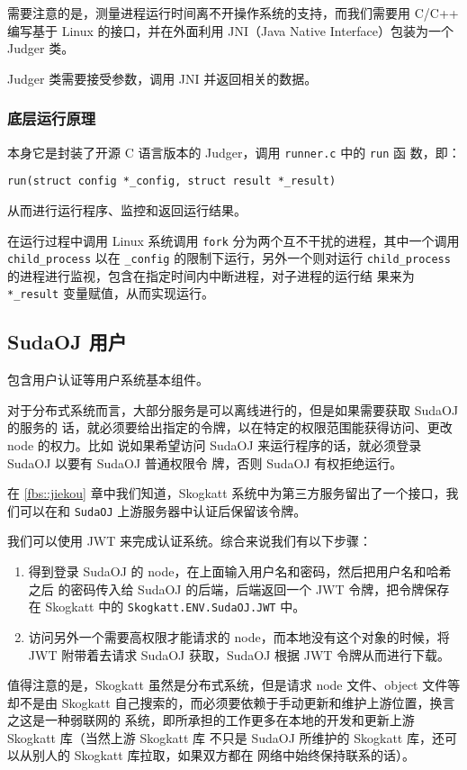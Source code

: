 需要注意的是，测量进程运行时间离不开操作系统的支持，而我们需要用 C/C++ 编写基于
Linux 的接口，并在外面利用 JNI（Java Native Interface）包装为一个 Judger 类。

Judger 类需要接受参数，调用 JNI 并返回相关的数据。

\subsubsection{底层运行原理}

本身它是封装了开源 C 语言版本的 Judger，调用 \verb|runner.c| 中的 \verb|run| 函
数，即：
\begin{lstlisting}
run(struct config *_config, struct result *_result)
\end{lstlisting}
从而进行运行程序、监控和返回运行结果。

在运行过程中调用 Linux 系统调用 \verb|fork| 分为两个互不干扰的进程，其中一个调用 %
\verb|child_process| 以在 \verb|_config| 的限制下运行，另外一个则对运行 %
\verb|child_process| 的进程进行监视，包含在指定时间内中断进程，对子进程的运行结
果来为 \verb|*_result| 变量赋值，从而实现运行。

\subsection{SudaOJ 用户}
包含用户认证等用户系统基本组件。

对于分布式系统而言，大部分服务是可以离线进行的，但是如果需要获取 SudaOJ 的服务的
话，就必须要给出指定的令牌，以在特定的权限范围能获得访问、更改 node 的权力。比如
说如果希望访问 SudaOJ 来运行程序的话，就必须登录 SudaOJ 以要有 SudaOJ 普通权限令
牌，否则 SudaOJ 有权拒绝运行。

在 \ref{fbs::jiekou} 章中我们知道，Skogkatt 系统中为第三方服务留出了一个接口，我
们可以在和 \verb|SudaOJ| 上游服务器中认证后保留该令牌。

我们可以使用 JWT 来完成认证系统。综合来说我们有以下步骤：
\begin{enumerate}
    \item 得到登录 SudaOJ 的 node，在上面输入用户名和密码，然后把用户名和哈希之后
        的密码传入给 SudaOJ 的后端，后端返回一个 JWT 令牌，把令牌保存在 Skogkatt %
        中的 \verb|Skogkatt.ENV.SudaOJ.JWT| 中。
    \item 访问另外一个需要高权限才能请求的 node，而本地没有这个对象的时候，将 JWT %
        附带着去请求 SudaOJ 获取，SudaOJ 根据 JWT 令牌从而进行下载。
\end{enumerate}

值得注意的是，Skogkatt 虽然是分布式系统，但是请求 node 文件、object 文件等却不是由 %
Skogkatt 自己搜索的，而必须要依赖于手动更新和维护上游位置，换言之这是一种弱联网的
系统，即所承担的工作更多在本地的开发和更新上游 Skogkatt 库（当然上游 Skogkatt 库
不只是 SudaOJ 所维护的 Skogkatt 库，还可以从别人的 Skogkatt 库拉取，如果双方都在
网络中始终保持联系的话）。

